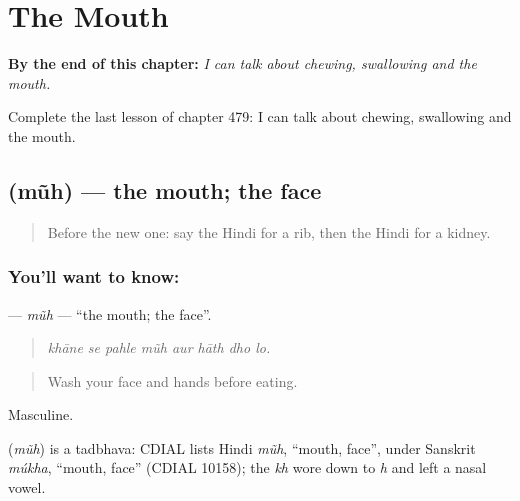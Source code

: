 
\chapter{The Mouth}
\label{ch:hi-the-mouth}

\begin{chapteropening}
\textbf{By the end of this chapter:} \emph{I can talk about chewing, swallowing and the mouth.}

Complete the last lesson of chapter 479: I can talk about chewing, swallowing and the mouth.
\end{chapteropening}

\section[\texorpdfstring{\hi{मुँह} (mũh)}{मुँह (mũh)}]{ (mũh) — the mouth; the face}

\label{lesson:HI-C479-muh}



\begin{quote}
Before the new one: say the Hindi for a rib, then the Hindi for a kidney.
\end{quote}

\subsection*{You'll want to know: }
\textbf{} — \emph{mũh} — \textquotedblleft{}the mouth; the face\textquotedblright{}.

\begin{quote}
       
\end{quote}

\begin{quote}
\emph{khāne se pahle mũh aur hāth dho lo.}
\end{quote}

\begin{quote}
Wash your face and hands before eating.
\end{quote}

Masculine.

\begin{cousinweb}
\textbf{} (\emph{mũh}) is a tadbhava: CDIAL lists Hindi \emph{mũh}, \textquotedblleft{}mouth, face\textquotedblright{}, under Sanskrit \emph{múkha}, \textquotedblleft{}mouth, face\textquotedblright{} (CDIAL 10158); the \emph{kh} wore down to \emph{h} and left a nasal vowel.
\end{cousinweb}

